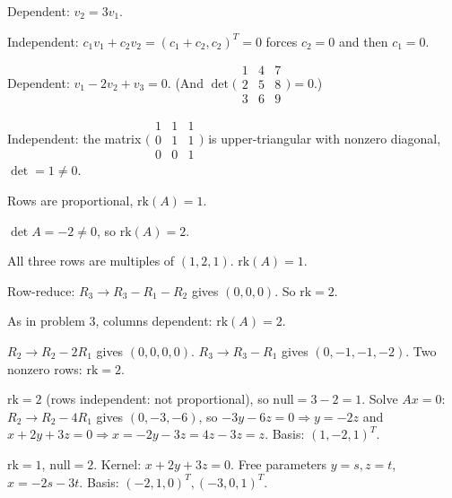 \begin{solutions}
    \item Dependent: $v_{2} = 3 v_{1}$.

    \item Independent: $c_{1} v_{1} + c_{2} v_{2} = (c_{1} + c_{2}, c_{2})^{T} = 0$ forces $c_{2} = 0$ and then $c_{1} = 0$.

    \item Dependent: $v_{1} - 2 v_{2} + v_{3} = 0$. (And $\det\bigl(\begin{smallmatrix} 1 & 4 & 7 \\ 2 & 5 & 8 \\ 3 & 6 & 9 \end{smallmatrix}\bigr) = 0$.)

    \item Independent: the matrix $\bigl(\begin{smallmatrix} 1 & 1 & 1 \\ 0 & 1 & 1 \\ 0 & 0 & 1 \end{smallmatrix}\bigr)$ is upper-triangular with nonzero diagonal, $\det = 1 \neq 0$.

    \item Rows are proportional, $\mathrm{rk}(A) = 1$.

    \item $\det A = -2 \neq 0$, so $\mathrm{rk}(A) = 2$.

    \item All three rows are multiples of $(1, 2, 1)$. $\mathrm{rk}(A) = 1$.

    \item Row-reduce: $R_{3} \to R_{3} - R_{1} - R_{2}$ gives $(0, 0, 0)$. So $\mathrm{rk} = 2$.

    \item As in problem 3, columns dependent: $\mathrm{rk}(A) = 2$.

    \item $R_{2} \to R_{2} - 2 R_{1}$ gives $(0, 0, 0, 0)$. $R_{3} \to R_{3} - R_{1}$ gives $(0, -1, -1, -2)$. Two nonzero rows: $\mathrm{rk} = 2$.

    \item $\mathrm{rk} = 2$ (rows independent: not proportional), so $\mathrm{null} = 3 - 2 = 1$. Solve $A x = 0$: $R_{2} \to R_{2} - 4 R_{1}$ gives $(0, -3, -6)$, so $-3 y - 6 z = 0 \Rightarrow y = -2 z$ and $x + 2 y + 3 z = 0 \Rightarrow x = -2 y - 3 z = 4 z - 3 z = z$. Basis: $(1, -2, 1)^{T}$.

    \item $\mathrm{rk} = 1$, $\mathrm{null} = 2$. Kernel: $x + 2 y + 3 z = 0$. Free parameters $y = s, z = t$, $x = -2 s - 3 t$. Basis: $(-2, 1, 0)^{T}, (-3, 0, 1)^{T}$.


\end{solutions}
